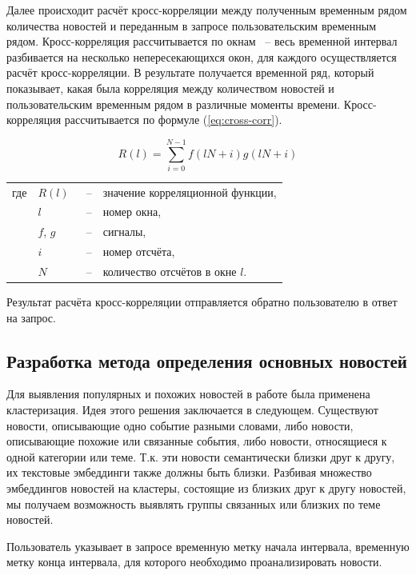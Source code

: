 Далее происходит расчёт кросс-корреляции между полученным временным рядом количества новостей и переданным в запросе пользовательским временным рядом. Кросс-корреляция рассчитывается по окнам ~-- весь временной интервал разбивается на несколько непересекающихся окон, для каждого осуществляется расчёт кросс-корреляции. В результате получается временной ряд, который показывает, какая была корреляция между количеством новостей и пользовательским временным рядом в различные моменты времени. Кросс-корреляция рассчитывается по формуле (\ref{eq:cross-corr}).

\begin{equation}
    R(l) = \sum_{i=0}^{N-1}{f(lN+i)g(lN+i)}
    \label{eq:cross-corr}
\end{equation}

\noindent\begin{tabularx}{\linewidth}{lllX}
    где & $R(l)$   &~--& значение корреляционной функции, \\
        & $l$      &~--& номер окна, \\
        & $f$, $g$ &~--& сигналы, \\
        & $i$      &~--& номер отсчёта, \\
        & $N$      &~--& количество отсчётов в окне $l$. \\
\end{tabularx}

Результат расчёта кросс-корреляции отправляется обратно пользователю в ответ на запрос.

\subsection{Разработка метода определения основных новостей}

Для выявления популярных и похожих новостей в работе была применена кластеризация. Идея этого решения заключается в следующем. Существуют новости, описывающие одно событие разными словами, либо новости, описывающие похожие или связанные события, либо новости, относящиеся к одной категории или теме. Т.к. эти новости семантически близки друг к другу, их текстовые эмбеддинги также должны быть близки. Разбивая множество эмбеддингов новостей на кластеры, состоящие из близких друг к другу новостей, мы получаем возможность выявлять группы связанных или близких по теме новостей.

Пользователь указывает в запросе временную метку начала интервала, временную метку конца интервала, для которого необходимо проанализировать новости.

